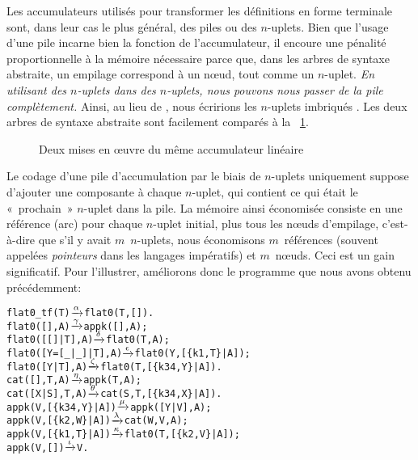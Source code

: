 Les accumulateurs utilisés pour transformer les définitions en forme
terminale sont, dans leur cas le plus général, des piles ou des
\(n\)-uplets. Bien que l'usage d'une pile incarne bien la fonction de
l'accumulateur, il encoure une pénalité proportionnelle à la mémoire
nécessaire parce que, dans les arbres de syntaxe abstraite, un
empilage correspond à un n{\oe}ud, tout comme un \(n\)-uplet. \emph{En
  utilisant des \(n\)-uplets dans des \(n\)-uplets, nous pouvons nous
  passer de la pile complètement.} Ainsi, au lieu de
\erlcode{[\{k3,\(X_1\)\},\{k1,\(V\),\(E\)\},\{k3,\(X_2\)\}]}, nous
écririons les \(n\)-uplets imbriqués
. Les
deux arbres de syntaxe abstraite sont facilement comparés à la
\fig~\ref{fig:tuple_vs_stack}.
\begin{figure}
\centering
{}
\caption{Deux mises en {\oe}uvre du même accumulateur linéaire}
\label{fig:tuple_vs_stack}
\end{figure}
Le codage d'une pile d'accumulation par le biais de \(n\)-uplets
uniquement suppose d'ajouter une composante à chaque \(n\)-uplet, qui
contient ce qui était le «~prochain~» \(n\)-uplet dans la pile. La
mémoire ainsi économisée consiste en une référence (arc) pour chaque
\(n\)-uplet initial, plus tous les n{\oe}uds d'empilage, c'est-à-dire
que s'il y avait \(m\)~\(n\)-uplets, nous économisons \(m\)~références
(souvent appelées \emph{pointeurs} dans les langages impératifs) et
\(m\)~n{\oe}uds. Ceci est un gain significatif. Pour l'illustrer,
améliorons donc le programme que nous avons obtenu précédemment:
\begin{alltt}
flat0\_tf(T)          \(\smashedrightarrow{\alpha}\) flat0(T,[]).
flat0(         [],A) \(\smashedrightarrow{\gamma}\) appk([],A);
flat0(     [[]|T],A) \(\smashedrightarrow{\delta}\) flat0(T,A);
flat0([Y=[\_|\_]|T],A) \(\smashedrightarrow{\epsilon}\) flat0(Y,[\{k1,T\}|A]);
flat0(    [Y|T],A)   \(\smashedrightarrow{\zeta}\) flat0(T,[\{k34,Y\}|A]).
cat(   [],T,A)       \(\smashedrightarrow{\eta}\) appk(T,A);
cat([X|S],T,A)       \(\smashedrightarrow{\theta}\) cat(S,T,[\{k34,X\}|A]).
appk(V,[\{k34,Y\}|A])  \(\smashedrightarrow{\mu}\) appk([Y|V],A);
appk(V, [\{k2,W\}|A])  \(\smashedrightarrow{\lambda}\) cat(W,V,A);
appk(V, [\{k1,T\}|A])  \(\smashedrightarrow{\kappa}\) flat0(T,[\{k2,V\}|A]);
appk(V,         [])  \(\smashedrightarrow{\iota}\) V.
\end{alltt}
